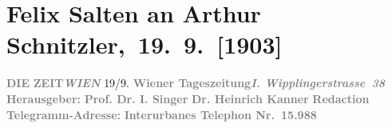

         
         \renewcommand{\erwaehntePersonen}{Personen: Max Eugen Burckhard, Karl Glossy, Heinrich Kanner, Richard Muther, Ferdinand von Saar, August Sauer, Isidor Singer}
         \renewcommand{\erwaehnteInstitutionen}{Institutionen: Die Zeit}
         \renewcommand{\erwaehnteOrte}{Orte: Wien, Wipplingerstraße}
         \renewcommand{\erwaehnteWerke}{}
               \section[ Felix Salten an Arthur Schnitzler, 19. 9. {[}1903{]}]{ Felix Salten an Arthur Schnitzler, 19. 9. {[}1903{]}}\nopagebreak{}\rehead{ }\begin{ledgroupsized}[t]{13cm}\normalsize\beginnumbering \toendnotes[C]{\smallbreak\pagebreak[2]} 
\toendnotes[C]{\smallbreak}\pstart
           \noindent{}{\pb}\textcolor{gray}{\textbf{DIE}}\pend
           \pstart
           \textcolor{gray}{\textbf{ZEIT}}\hfill \textcolor{gray}{\textbf{\emph{WIEN}}}{ }19/9.\pend
           \pstart
           \textcolor{gray}{\textbf{Wiener Tageszeitung}}\hfill \textcolor{gray}{\textbf{\emph{I. Wipplingerstrasse 38}}}\pend
           \pstart
           \textcolor{gray}{\textbf{Herausgeber:}}\pend
           \pstart
           \textcolor{gray}{\textbf{\textbf{Prof. Dr. I. Singer}}}\pend
           \pstart
           \textcolor{gray}{\textbf{\textbf{Dr. Heinrich Kanner}}}\pend
           \pstart
           \textcolor{gray}{\textbf{\textbf{Redaction}}}\pend
           \pstart
           \textcolor{gray}{\textbf{Telegramm-Adresse: \so{,}{ }}}\pend
           \pstart
           \textcolor{gray}{\textbf{Interurbanes Telephon Nr. 15.988}}\pend
           \pstart

\end{ledgroupsized}
